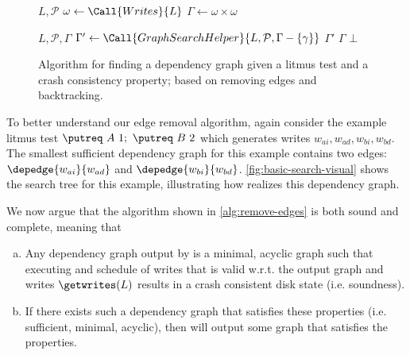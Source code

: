 \begin{figure}[h]
\begin{algorithmic}[1]
    {$L, \mathcal{P}$} 
    \State $\omega \gets \Call{Writes}{L}$ 
    \State $\Gamma \gets \omega \times \omega$ 
    \State \Return {}
  \EndFunction

    {$L, \mathcal{P}, \Gamma$} 
    \For{$\gamma\in\Gamma$}
      \State $\Gamma' \gets \Call{GraphSearchHelper}{L, \mathcal{P}, \Gamma - \{\gamma\}}$
        \State \Return $\Gamma'$
      \EndIf
    \EndFor
      \State \Return $\Gamma$
    \EndIf
    \State \Return $\bot$
  \EndFunction
\end{algorithmic}
\caption{Algorithm for finding a dependency graph given a litmus test and a crash consistency
property; based on removing edges and backtracking.\tighten}
\label{alg:remove-edges}
\end{figure}

To better understand our edge removal algorithm, again consider the example
litmus test $ \putreq\ A\ 1;\ \putreq\ B\ 2$
which generates writes $w_{ai}, w_{ad}, w_{bi}, w_{bd}$.
The smallest sufficient dependency graph for this example contains two edges:
$\depedge{w_{ai}}{w_{ad}}$ and $\depedge{w_{bi}}{w_{bd}}$.
\autoref{fig:basic-search-visual} shows the search tree for this example,
illustrating how \graphsearch realizes this dependency graph.

We now argue that the algorithm shown in \autoref{alg:remove-edges} is both sound and complete, meaning that
\begin{enumerate}[(a)]
\item Any dependency graph output by \graphsearch is a minimal, acyclic graph such that executing
      and schedule of writes that is valid w.r.t. the output graph and writes $\getwrites(L)$
      results in a crash consistent disk state (i.e. soundness).
\item If there exists such a dependency graph that satisfies these properties (i.e. sufficient, minimal,
      acyclic), then \graphsearch will output some graph that satisfies the properties.
\end{enumerate}

